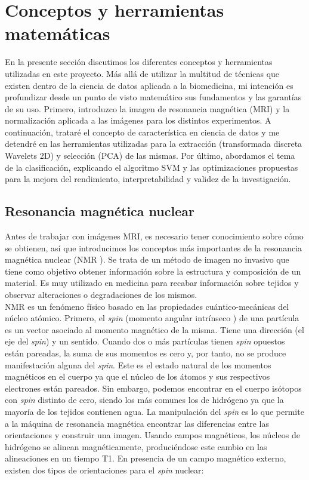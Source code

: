 \section{Conceptos y herramientas matemáticas}

En la presente sección discutimos los diferentes conceptos y herramientas utilizadas en este proyecto. Más allá de utilizar la multitud de técnicas que existen dentro de la ciencia de datos aplicada a la biomedicina, mi intención es profundizar desde un punto de visto matemático sus fundamentos y las garantías de su uso. Primero, introduzco la imagen de resonancia magnética (MRI) y la normalización aplicada a las imágenes para los distintos experimentos. A continuación, trataré el concepto de característica en ciencia de datos y me detendré en las herramientas utilizadas para la extracción (transformada discreta Wavelets 2D) y selección (PCA) de las mismas. Por último, abordamos el tema de la clasificación, explicando el algoritmo SVM y las optimizaciones propuestas para la mejora del rendimiento,  interpretabilidad y validez de la investigación.

\subsection{Resonancia magnética nuclear}

Antes de trabajar con imágenes MRI, es necesario tener conocimiento sobre cómo se obtienen, así que introducimos los conceptos más importantes de la resonancia magnética nuclear (NMR \cite{nmr}). Se trata de un método de imagen no invasivo que tiene como objetivo obtener información sobre la estructura y composición de un material. Es muy utilizado en medicina para recabar información sobre tejidos y observar alteraciones o degradaciones de los mismos. \\

NMR es un fenómeno físico basado en las propiedades cuántico-mecánicas del núcleo atómico. Primero, el \textit{spin} (momento angular intrínseco \cite{spin}) de una partícula es un vector asociado al momento magnético de la misma. Tiene una dirección (el eje del \textit{spin}) y un sentido. Cuando dos o más partículas tienen \textit{spin} opuestos están pareadas, la suma de sus momentos es cero y, por tanto, no se produce manifestación alguna del \textit{spin}. Este es el estado natural de los momentos magnéticos en el cuerpo ya que el núcleo de los átomos y sus respectivos electrones están pareados. Sin embargo, podemos encontrar en el cuerpo isótopos con \textit{spin} distinto de cero, siendo los más comunes los de hidrógeno ya que la mayoría de los tejidos contienen agua. La manipulación del \textit{spin} es lo que permite a la máquina de resonancia magnética encontrar las diferencias entre las orientaciones y construir una imagen. Usando campos magnéticos, los núcleos de hidrógeno se alinean magnéticamente, produciéndose este cambio en las alineaciones en un tiempo T1. En presencia de un campo magnético externo, existen dos tipos de orientaciones para el \textit{spin} nuclear:

